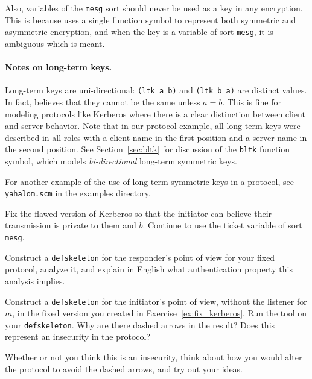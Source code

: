 Also, variables of the \texttt{mesg} sort should never be used as a
key in any encryption.  This is because {\cpsa} uses a single function
symbol to represent both symmetric and asymmetric encryption, and when
the key is a variable of sort \texttt{mesg}, it is ambiguous which is
meant.

\paragraph{Notes on long-term keys.}
Long-term keys are uni-directional: \texttt{(ltk a b)} and
\texttt{(ltk b a)} are distinct values.  In fact, {\cpsa} believes
that they cannot be the same unless $a = b$.  This is fine for
modeling protocols like Kerberos where there is a clear distinction
between client and server behavior.  Note that in our protocol
example, all long-term keys were described in all roles with a client
name in the first position and a server name in the second position.
See Section~\ref{sec:bltk} for discussion of the
\texttt{bltk} function symbol, which models \emph{bi-directional}
long-term symmetric keys.

For another example of the use of long-term symmetric keys in a
protocol, see \texttt{yahalom.scm} in the examples directory.

\begin{exercise}
\label{ex:fix_kerberos}
Fix the flawed version of Kerberos so that the initiator can believe
their transmission is private to them and $b$.  Continue to use the
ticket variable of sort \texttt{mesg}.

Construct a \texttt{defskeleton} for the responder's point of view
for your fixed protocol, analyze it, and explain in English what
authentication property this analysis implies.
\end{exercise}

\begin{exercise}
  Construct a \texttt{defskeleton} for the initiator's point of view,
  without the listener for $m$, in the fixed version you created in
  Exercise~\ref{ex:fix_kerberos}.  Run the tool on your
  \texttt{defskeleton}.  Why are there dashed arrows in the result?
  Does this represent an insecurity in the protocol?

Whether or not you think this is an insecurity, think about how you
would alter the protocol to avoid the dashed arrows, and try out your
ideas.
\end{exercise}

